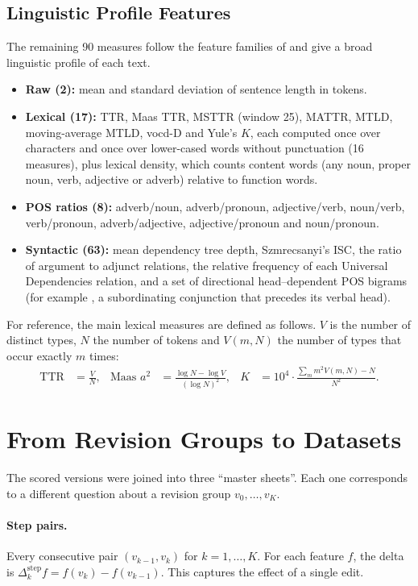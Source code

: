 \documentclass[12pt,a4paper,oneside]{report}
\newcommand{\feat}[1]{\texttt{\detokenize{#1}}}
\begin{document}
\subsection{Linguistic Profile Features}
The remaining 90 measures follow the feature families of \citet{kazmi2022} and give a broad linguistic profile of each text.
\begin{itemize}
  \item \textbf{Raw (2):} mean and standard deviation of sentence length in tokens.
  \item \textbf{Lexical (17):} TTR, Maas TTR, MSTTR (window 25), MATTR, MTLD, moving-average MTLD, vocd-D and Yule's $K$, each computed once over characters and once over lower-cased words without punctuation (16 measures), plus lexical density, which counts content words (any noun, proper noun, verb, adjective or adverb) relative to function words.
  \item \textbf{POS ratios (8):} adverb/noun, adverb/pronoun, adjective/verb, noun/verb, verb/pronoun, adverb/adjective, adjective/pronoun and noun/pronoun.
  \item \textbf{Syntactic (63):} mean dependency tree depth, Szmrecsanyi's ISC, the ratio of argument to adjunct relations, the relative frequency of each Universal Dependencies relation, and a set of directional head--dependent POS bigrams (for example \feat{depbig_VERB_SCONJ_before}, a subordinating conjunction that precedes its verbal head).
\end{itemize}
For reference, the main lexical measures are defined as follows. $V$ is the number of distinct types, $N$ the number of tokens and $V(m,N)$ the number of types that occur exactly $m$ times:
\begin{align}
  \mathrm{TTR} &= \frac{V}{N}, &
  \text{Maas } a^2 &= \frac{\log N - \log V}{(\log N)^2}, &
  K &= 10^4 \cdot \frac{\sum_m m^2 V(m,N) - N}{N^2}.
\end{align}

\section{From Revision Groups to Datasets}
\label{sec:sheets}
The scored versions were joined into three ``master sheets''. Each one corresponds to a different question about a revision group $v_0, \ldots, v_K$.

\paragraph{Step pairs.} Every consecutive pair $(v_{k-1}, v_k)$ for $k = 1, \ldots, K$. For each feature $f$, the delta is $\Delta^{\text{step}}_k f = f(v_k) - f(v_{k-1})$. This captures the effect of a single edit.
\end{document}
